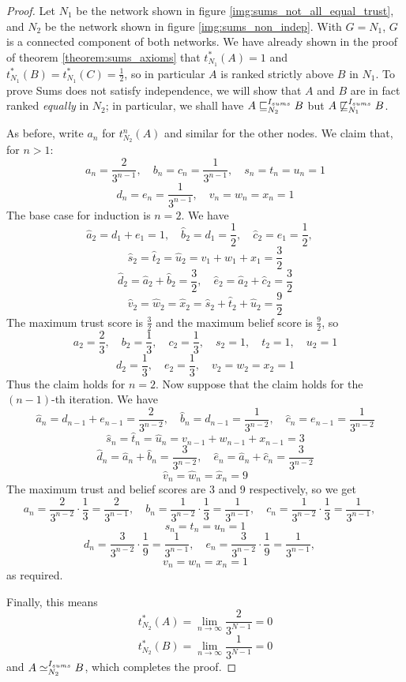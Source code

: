 \documentclass[../main.tex]{subfiles}
\begin{document}
\begin{proof}
Let $N_1$ be the network shown in figure \ref{img:sums_not_all_equal_trust},
and $N_2$ be the network shown in figure \ref{img:sums_non_indep}. With
$G=N_1$, $G$ is a connected component of both networks. We have already shown
in the proof of theorem \ref{theorem:sums_axioms} that $t_{N_1}^*(A) = 1$ and
$t_{N_1}^*(B) = t_{N_1}^*(C) = \frac{1}{2}$, so in particular $A$ is ranked
strictly above $B$ in $N_1$. To prove Sums does not satisfy independence, we
will show that $A$ and $B$ are in fact ranked \emph{equally} in $N_2$; in
particular, we shall have $A \sqsubseteq_{N_2}^{I_{sums}} B$ but $A
\not\sqsubseteq_{N_1}^{I_{sums}} B$.

As before, write $a_n$ for $t_{N_2}^n(A)$ and similar for the other nodes. We
claim that, for $n > 1$:
\[
    a_n = \frac{2}{3^{n - 1}}, \quad
    b_n = c_n = \frac{1}{3^{n - 1}}, \quad
    s_n = t_n = u_n = 1
\]
\[
    d_n = e_n = \frac{1}{3^{n - 1}}, \quad
    v_n = w_n = x_n = 1
\]
The base case for induction is $n = 2$. We have
\[
    \hat{a}_2 = d_1 + e_1 = 1, \quad
    \hat{b}_2 = d_1 = \frac{1}{2}, \quad
    \hat{c}_2 = e_1 = \frac{1}{2}, \quad
\]
\[
    \hat{s}_2 = \hat{t}_2 = \hat{u}_2 = v_1 + w_1 + x_1
    = \frac{3}{2}
\]
\[
    \hat{d}_2 = \hat{a}_2 + \hat{b}_2 = \frac{3}{2}, \quad
    \hat{e}_2 = \hat{a}_2 + \hat{c}_2 = \frac{3}{2}
\]
\[
    \hat{v}_2 = \hat{w}_2 = \hat{x}_2 = \hat{s}_2 + \hat{t}_2 + \hat{u}_2
    = \frac{9}{2}
\]
The maximum trust score is $\frac{3}{2}$ and the maximum belief score is
$\frac{9}{2}$, so
\[
    a_2 = \frac{2}{3}, \quad
    b_2 = \frac{1}{3}, \quad
    c_2 = \frac{1}{3}, \quad
    s_2 = 1, \quad
    t_2 = 1, \quad
    u_2 = 1
\]
\[
    d_2 = \frac{1}{3}, \quad
    e_2 = \frac{1}{3}, \quad
    v_2 = w_2 = x_2 = 1
\]
Thus the claim holds for $n = 2$. Now suppose that the claim holds for the $(n
- 1)$-th iteration. We have
\[
    \hat{a}_n = d_{n-1} + e_{n-1}
              = \frac{2}{3^{n-2}}, \quad
    \hat{b}_n = d_{n-1}
              = \frac{1}{3^{n-2}}, \quad
    \hat{c}_n = e_{n-1}
              = \frac{1}{3^{n-2}}
\]
\[
    \hat{s}_n = \hat{t}_n = \hat{u}_n
    = v_{n-1} + w_{n-1} + x_{n-1}
    = 3
\]
\[
    \hat{d}_n = \hat{a}_n + \hat{b}_n
              = \frac{3}{3^{n - 2}}, \quad
    \hat{e}_n = \hat{a}_n + \hat{c}_n
              = \frac{3}{3^{n - 2}}
\]
\[
    \hat{v}_n = \hat{w}_n = \hat{x}_n = 9
\]
The maximum trust and belief scores are 3 and 9 respectively, so we get
\[
    a_n = \frac{2}{3^{n-2}}\cdot\frac{1}{3}
        = \frac{2}{3^{n-1}}, \quad
    b_n = \frac{1}{3^{n-2}}\cdot\frac{1}{3}
        = \frac{1}{3^{n-1}}, \quad
    c_n = \frac{1}{3^{n-2}}\cdot\frac{1}{3}
        = \frac{1}{3^{n-1}}, \quad
\]
\[
    s_n = t_n = u_n = 1
\]
\[
    d_n = \frac{3}{3^{n-2}}\cdot\frac{1}{9}
        = \frac{1}{3^{n-1}}, \quad
    e_n = \frac{3}{3^{n-2}}\cdot\frac{1}{9}
        = \frac{1}{3^{n-1}}, \quad
\]
\[
    v_n = w_n = x_n = 1
\]
as required.

Finally, this means
\[ t_{N_2}^*(A) = \lim_{n \rightarrow \infty}\frac{2}{3^{N-1}} = 0 \]
\[ t_{N_2}^*(B) = \lim_{n \rightarrow \infty}\frac{1}{3^{N-1}} = 0 \]
and $A \simeq_{N_2}^{I_{sums}} B$, which completes the proof.

\end{proof}
\end{document}
